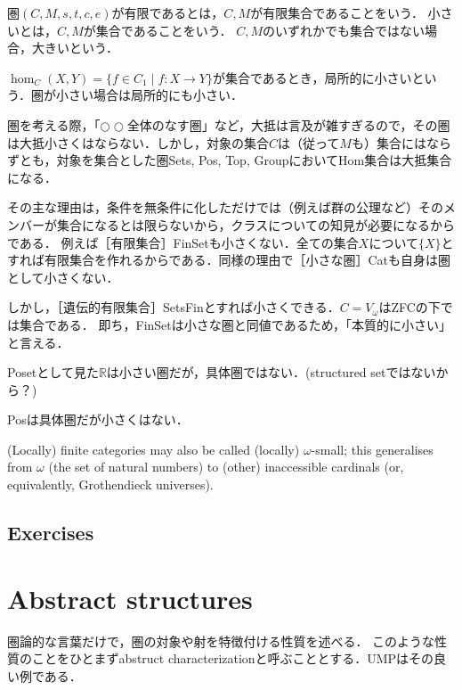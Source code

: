 \documentclass[uplatex, dvipdfmx]{jsarticle}
\begin{document}
\begin{definition}
    圏$(C,M,s,t,c,e)$が有限であるとは，$C,M$が有限集合であることをいう．
    小さいとは，$C,M$が集合であることをいう．
    $C,M$のいずれかでも集合ではない場合，大きいという．
\end{definition}

\begin{definition}
    $\hom_C(X,Y)=\{ f\in C_1\mid f:X\to Y \}$が集合であるとき，局所的に小さいという．圏が小さい場合は局所的にも小さい．
\end{definition}
\begin{remark*}
    圏を考える際，「$\bigcirc\bigcirc$全体のなす圏」など，大抵は言及が雑すぎるので，その圏は大抵小さくはならない．しかし，対象の集合$C$は（従って$M$も）集合にはならずとも，対象を集合とした圏Sets, Pos, Top, GroupにおいてHom集合は大抵集合になる．

    その主な理由は，条件を無条件に化しただけでは（例えば群の公理など）そのメンバーが集合になるとは限らないから，クラスについての知見が必要になるからである．
    例えば［有限集合］FinSetも小さくない．全ての集合$X$について$\{X\}$とすれば有限集合を作れるからである．同様の理由で［小さな圏］Catも自身は圏として小さくない．

    しかし，［遺伝的有限集合］SetsFinとすれば小さくできる．$C=V_\omega$はZFCの下では集合である．
    即ち，FinSetは小さな圏と同値であるため，「本質的に小さい」と言える．
\end{remark*}


\begin{remark}
    Posetとして見た$\mathbb{R}$は小さい圏だが，具体圏ではない．(structured setではないから？)

    Posは具体圏だが小さくはない．
\end{remark}

\begin{remark*}
    (Locally) finite categories may also be called (locally) $\omega$-small; this generalises from $\omega$ (the set of natural numbers) to (other) inaccessible cardinals (or, equivalently, Grothendieck universes).
\end{remark*}

\subsection{Exercises}

\section{Abstract structures}
圏論的な言葉だけで，圏の対象や射を特徴付ける性質を述べる．
このような性質のことをひとまずabstruct characterizationと呼ぶこととする．UMPはその良い例である．
\end{document}

